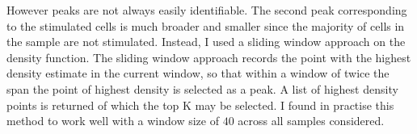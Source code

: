 However peaks are not always easily identifiable.
The second peak corresponding to the stimulated cells is much broader and smaller since the majority of cells in the sample are not stimulated.
Instead, I used a sliding window approach on the density function.
The sliding window approach records the point with the highest density estimate in the current window,
so that within a window of twice the span the point of highest density is selected as a peak.
A list of highest density points is returned of which the top K may be selected.
I found in practise this method to work well with a window size of $40$ across all samples considered.

